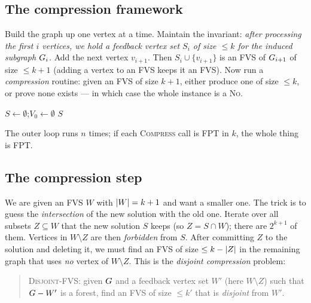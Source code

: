 \subsection{The compression framework}

Build the graph up one vertex at a time. Maintain the invariant: \emph{after processing the first $i$ vertices, we hold a feedback vertex set $S_i$ of size $\le k$ for the induced subgraph $G_i$}. Add the next vertex $v_{i+1}$. Then $S_i\cup\{v_{i+1}\}$ is an FVS of $G_{i+1}$ of size $\le k+1$ (adding a vertex to an FVS keeps it an FVS). Now run a \emph{compression} routine: given an FVS of size $k+1$, either produce one of size $\le k$, or prove none exists --- in which case the whole instance is a \textsc{No}.

\begin{algorithm}[H]
\caption{\textsc{IterativeFVS}$(\Gph,k)$ --- build-and-compress}
\label{ch25:alg-itercomp}
\DontPrintSemicolon
{}
$S \gets \emptyset$;\quad $V_0\gets\emptyset$\;
\Return $S$\;
\end{algorithm}

The outer loop runs $n$ times; if each \textsc{Compress} call is FPT in $k$, the whole thing is FPT.

\subsection{The compression step}

We are given an FVS $W$ with $\lvert W\rvert=k+1$ and want a smaller one. The trick is to guess the \emph{intersection} of the new solution with the old one. Iterate over all subsets $Z\subseteq W$ that the new solution $S$ keeps (so $Z = S\cap W$); there are $2^{k+1}$ of them. Vertices in $W\setminus Z$ are then \emph{forbidden} from $S$. After committing $Z$ to the solution and deleting it, we must find an FVS of size $\le k-\lvert Z\rvert$ in the remaining graph that uses \emph{no} vertex of $W\setminus Z$. This is the \emph{disjoint compression} problem:

\begin{quote}
\textsc{Disjoint-FVS}: given $G$ and a feedback vertex set $W'$ (here $W\setminus Z$) such that $G - W'$ is a forest, find an FVS of size $\le k'$ that is \emph{disjoint} from $W'$.
\end{quote}

